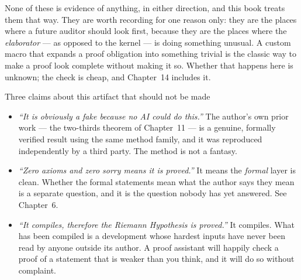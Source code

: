 None of these is evidence of anything, in either direction, and this book
treats them that way. They are worth recording for one reason only: they are
the places where a future auditor should look first, because they are the
places where the \emph{elaborator} --- as opposed to the kernel --- is doing
something unusual. A custom macro that expands a proof obligation into
something trivial is the classic way to make a proof look complete without
making it so. Whether that happens here is unknown; the check is cheap, and
Chapter~14 includes it.

\begin{mythbox}{Three claims about this artifact that should not be made}
\begin{itemize}
\item \emph{``It is obviously a fake because no AI could do this.''} The
author's own prior work --- the two-thirds theorem of Chapter~11 --- is a
genuine, formally verified result using the same method family, and it was
reproduced independently by a third party. The method is not a fantasy.
\item \emph{``Zero axioms and zero sorry means it is proved.''} It means the
\emph{formal} layer is clean. Whether the formal statements mean what the
author says they mean is a separate question, and it is the question nobody has
yet answered. See Chapter~6.
\item \emph{``It compiles, therefore the Riemann Hypothesis is proved.''} It
compiles. What has been compiled is a development whose hardest inputs have
never been read by anyone outside its author. A proof assistant will happily
check a proof of a statement that is weaker than you think, and it will do so
without complaint.
\end{itemize}
\end{mythbox}

\vspace{8pt}
